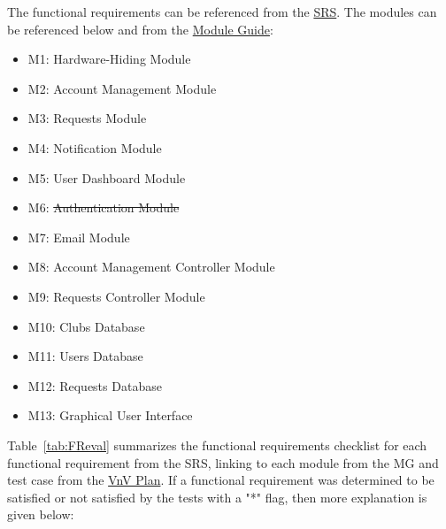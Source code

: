 \documentclass[12pt, titlepage]{article}
\begin{document}
The functional requirements can be referenced from the \href{https://github.com/ausbennett/mes-finance-platform/blob/main/docs/SRS/SRS.pdf}{SRS}. The modules can be referenced below and from the \href{https://github.com/ausbennett/mes-finance-platform/blob/main/docs/Design/SoftArchitecture/MG.pdf}{Module Guide}:

\begin{itemize}
    \item M1: Hardware-Hiding Module
    \item M2: Account Management Module
    \item M3: Requests Module
    \item M4: Notification Module
    \item M5: User Dashboard Module
    \item M6: \st{Authentication Module}
    \item M7: Email Module
    \item M8: Account Management Controller Module
    \item M9: Requests Controller Module
    \item M10: Clubs Database
    \item M11: Users Database
    \item M12: Requests Database
    \item M13: Graphical User Interface
\end{itemize}

Table~\ref{tab:FReval} summarizes the functional requirements checklist for each functional requirement from the SRS, linking to each module from the MG and test case from the \href{https://github.com/ausbennett/mes-finance-platform/blob/main/docs/VnVPlan/VnVPlan.pdf}{VnV Plan}. If a functional requirement was determined to be satisfied or not satisfied by the tests with a "*" flag, then more explanation is given below:
\end{document}

